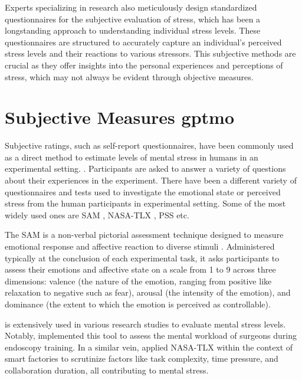 Experts specializing in research also meticulously design standardized questionnaires for the subjective evaluation of stress, which has been a longstanding approach to understanding individual stress levels. These questionnaires are structured to accurately capture an individual's perceived stress levels and their reactions to various stressors. This subjective methods are crucial as they offer insights into the personal experiences and perceptions of stress, which may not always be evident through objective measures.

\section{Subjective Measures \gls{gptmo}}

Subjective ratings, such as self-report questionnaires, have
been commonly used as a direct method to estimate levels of mental stress in humans in an experimental setting.
\parencite{aigram}. Participants are asked to answer a variety of
questions about their experiences in the experiment. There have been a different variety of questionnaires and tests used to investigate the emotional state or perceived stress from the human participants in experimental setting. Some of the most widely used ones are \gls{SAM} \parencite{SAM}, \gls{NASA-TLX} \parencite{tlx}, \gls{PSS} \parencite{pss} etc.

 The \gls{SAM} is a non-verbal pictorial assessment technique designed to measure emotional response and affective reaction to diverse stimuli \parencite{SAM}. Administered typically at the conclusion of each experimental task, it asks participants to assess their emotions and affective state on a scale from 1 to 9 across three dimensions: valence (the nature of the emotion, ranging from positive like relaxation to negative such as fear), arousal (the intensity of the emotion), and dominance (the extent to which the emotion is perceived as controllable).


  is extensively used in various research studies to evaluate mental stress levels. Notably, \textcite{tlxstress} implemented this tool to assess the mental workload of surgeons during endoscopy training. In a similar vein, \textcite{Zaki} applied NASA-TLX within the context of smart factories to scrutinize factors like task complexity, time pressure, and collaboration duration, all contributing to mental stress.

